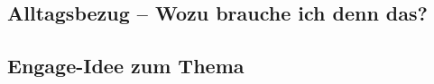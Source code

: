 

\subsection*{Alltagsbezug -- Wozu brauche ich denn das?}




\subsection*{Engage-Idee zum Thema}



